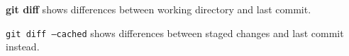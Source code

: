 %

\textbf{git diff}\marginpar[\textbf{\color{blue}{diff}}]{\textbf{\color{blue}{diff}}} shows differences between working directory and last commit.

\texttt{git diff --cached} shows differences between staged changes and last commit instead.

%